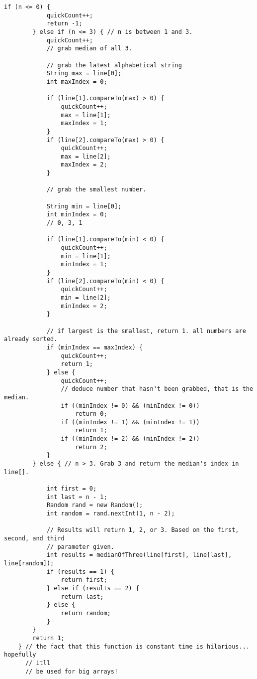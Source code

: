 \documentclass[letterpaper, 10pt,DIV=13]{scrartcl}
\numberwithin{equation}{section} %
\numberwithin{figure}{section} %
\numberwithin{table}{section} %
\begin{document}
\begin{lstlisting}[frame=single, ]
        if (n <= 0) {
            quickCount++;
            return -1;
        } else if (n <= 3) { // n is between 1 and 3.
            quickCount++;
            // grab median of all 3.

            // grab the latest alphabetical string
            String max = line[0];
            int maxIndex = 0;

            if (line[1].compareTo(max) > 0) {
                quickCount++;
                max = line[1];
                maxIndex = 1;
            }
            if (line[2].compareTo(max) > 0) {
                quickCount++;
                max = line[2];
                maxIndex = 2;
            }

            // grab the smallest number.

            String min = line[0];
            int minIndex = 0;
            // 0, 3, 1

            if (line[1].compareTo(min) < 0) {
                quickCount++;
                min = line[1];
                minIndex = 1;
            }
            if (line[2].compareTo(min) < 0) {
                quickCount++;
                min = line[2];
                minIndex = 2;
            }

            // if largest is the smallest, return 1. all numbers are already sorted.
            if (minIndex == maxIndex) {
                quickCount++;
                return 1;
            } else {
                quickCount++;
                // deduce number that hasn't been grabbed, that is the median.
                if ((minIndex != 0) && (minIndex != 0))
                    return 0;
                if ((minIndex != 1) && (minIndex != 1))
                    return 1;
                if ((minIndex != 2) && (minIndex != 2))
                    return 2;
            }
        } else { // n > 3. Grab 3 and return the median's index in line[].

            int first = 0;
            int last = n - 1;
            Random rand = new Random();
            int random = rand.nextInt(1, n - 2);

            // Results will return 1, 2, or 3. Based on the first, second, and third
            // parameter given.
            int results = medianOfThree(line[first], line[last], line[random]);
            if (results == 1) {
                return first;
            } else if (results == 2) {
                return last;
            } else {
                return random;
            }
        }
        return 1;
    } // the fact that this function is constant time is hilarious... hopefully
      // itll
      // be used for big arrays!


\end{lstlisting}
\end{document}
